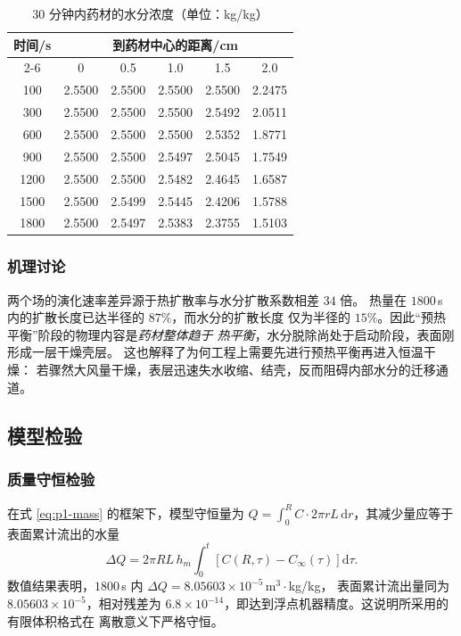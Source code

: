 \documentclass[12pt,a4paper]{ctexart}
\begin{document}
\begin{table}[htbp]
  \centering
  \caption{30 分钟内药材的水分浓度（单位：kg/kg）}
  \label{tab:p1-C}
  \begin{tabular}{cccccc}
    \toprule
    \multirow{2}{*}{时间/s} & \multicolumn{5}{c}{到药材中心的距离/cm} \\
    \cmidrule(lr){2-6}
     & 0     & 0.5   & 1.0   & 1.5   & 2.0 \\
    \midrule
    100  & 2.5500 & 2.5500 & 2.5500 & 2.5500 & 2.2475 \\
    300  & 2.5500 & 2.5500 & 2.5500 & 2.5492 & 2.0511 \\
    600  & 2.5500 & 2.5500 & 2.5500 & 2.5352 & 1.8771 \\
    900  & 2.5500 & 2.5500 & 2.5497 & 2.5045 & 1.7549 \\
    1200 & 2.5500 & 2.5500 & 2.5482 & 2.4645 & 1.6587 \\
    1500 & 2.5500 & 2.5499 & 2.5445 & 2.4206 & 1.5788 \\
    1800 & 2.5500 & 2.5497 & 2.5383 & 2.3755 & 1.5103 \\
    \bottomrule
  \end{tabular}
\end{table}

\subsubsection{机理讨论}

两个场的演化速率差异源于热扩散率与水分扩散系数相差 $34$ 倍。
热量在 $1800$\,s 内的扩散长度已达半径的 $87\%$，而水分的扩散长度
仅为半径的 $15\%$。因此``预热平衡''阶段的物理内容是\emph{药材整体趋于
热平衡}，水分脱除尚处于启动阶段，表面刚形成一层干燥壳层。
这也解释了为何工程上需要先进行预热平衡再进入恒温干燥：
若骤然大风量干燥，表层迅速失水收缩、结壳，反而阻碍内部水分的迁移通道。

\subsection{模型检验}

\subsubsection{质量守恒检验}

在式 \eqref{eq:p1-mass} 的框架下，模型守恒量为 $Q=\int_0^R C\cdot2\pi rL
\,\mathrm{d}r$，其减少量应等于表面累计流出的水量
\begin{equation}
  \Delta Q
  =2\pi RL\,h_m\int_0^{t}\left[C(R,\tau)-C_\infty(\tau)\right]\mathrm{d}\tau .
  \label{eq:p1-conservation}
\end{equation}
数值结果表明，$1800$\,s 内 $\Delta Q=8.05603\times10^{-5}$\,m$^3\!\cdot$kg/kg，
表面累计流出量同为 $8.05603\times10^{-5}$，相对残差为
$6.8\times10^{-14}$，即达到浮点机器精度。这说明所采用的有限体积格式在
离散意义下严格守恒。
\end{document}
